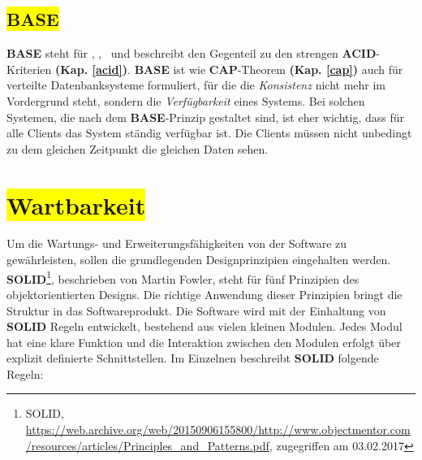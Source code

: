%



\subsection{\colorbox{yellow}{BASE}}\label{base}

\textbf{BASE} steht für \BAse, \baSe, \basE\ und beschreibt den Gegenteil zu den strengen \textbf{ACID}-Kriterien \textbf{(Kap. \ref{acid})}. \textbf{BASE} ist wie \textbf{CAP}-Theorem \textbf{(Kap. \ref{cap})} auch für verteilte Datenbanksysteme formuliert, für die die \textit{Konsistenz} nicht mehr im Vordergrund steht, sondern die \textit{Verfügbarkeit} eines Systems. Bei solchen Systemen, die nach dem \textbf{BASE}-Prinzip gestaltet sind, ist eher wichtig, dass für alle Clients das System ständig verfügbar ist. Die Clients müssen nicht unbedingt zu dem gleichen Zeitpunkt die gleichen Daten sehen.


\section{\colorbox{yellow}{Wartbarkeit}}\label{maintenance}

Um die Wartungs- und Erweiterungsfähigkeiten von der Software zu gewährleisten, sollen die grundlegenden Designprinzipien eingehalten werden. \textbf{SOLID}\footnote{SOLID, \url{https://web.archive.org/web/20150906155800/http://www.objectmentor.com/resources/articles/Principles_and_Patterns.pdf}, zugegriffen am 03.02.2017}, beschrieben von Martin Fowler, steht für fünf Prinzipien des objektorientierten Designs. Die richtige Anwendung dieser Prinzipien bringt die Struktur in das Softwareprodukt. Die Software wird mit der Einhaltung von \textbf{SOLID} Regeln entwickelt, bestehend aus vielen kleinen Modulen. Jedes Modul hat eine klare Funktion und die Interaktion zwischen den Modulen erfolgt über explizit definierte Schnittstellen. Im Einzelnen beschreibt \textbf{SOLID} folgende Regeln:

